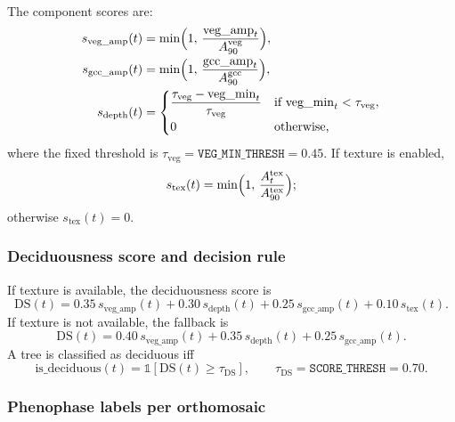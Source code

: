 The component scores are:
\begin{align}
 s_{\mathrm{veg\_amp}}(t) &= \min\Bigl(1,\, \frac{\mathrm{veg\_amp}_t}{A_{90}^{\mathrm{veg}}}\Bigr),\\
 s_{\mathrm{gcc\_amp}}(t) &= \min\Bigl(1,\, \frac{\mathrm{gcc\_amp}_t}{A_{90}^{\mathrm{gcc}}}\Bigr),\\
 s_{\mathrm{depth}}(t) &=
\begin{cases}
\dfrac{\tau_{\mathrm{veg}}-\mathrm{veg\_min}_t}{\tau_{\mathrm{veg}}} & \text{if } \mathrm{veg\_min}_t < \tau_{\mathrm{veg}},\\
0 & \text{otherwise,}
\end{cases}
\end{align}
where the fixed threshold is $\tau_{\mathrm{veg}}=\texttt{VEG\_MIN\_THRESH}=0.45$.
If texture is enabled,
\begin{equation}
 s_{\mathrm{tex}}(t)=\min\Bigl(1,\,\frac{A_t^{\mathrm{tex}}}{A_{90}^{\mathrm{tex}}}\Bigr);
\end{equation}
otherwise $s_{\mathrm{tex}}(t)=0$.

\subsubsection{Deciduousness score and decision rule}

If texture is available, the deciduousness score is
\begin{equation}
\mathrm{DS}(t)=0.35\,s_{\mathrm{veg\_amp}}(t)+0.30\,s_{\mathrm{depth}}(t)+0.25\,s_{\mathrm{gcc\_amp}}(t)+0.10\,s_{\mathrm{tex}}(t).
\end{equation}
If texture is not available, the fallback is
\begin{equation}
\mathrm{DS}(t)=0.40\,s_{\mathrm{veg\_amp}}(t)+0.35\,s_{\mathrm{depth}}(t)+0.25\,s_{\mathrm{gcc\_amp}}(t).
\end{equation}
A tree is classified as deciduous iff
\begin{equation}
\mathrm{is\_deciduous}(t)=\mathbb{1}[\mathrm{DS}(t)\ge \tau_{\mathrm{DS}}],\qquad \tau_{\mathrm{DS}}=\texttt{SCORE\_THRESH}=0.70.
\end{equation}

\subsubsection{Phenophase labels per orthomosaic}

